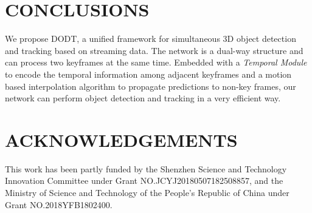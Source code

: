 \documentclass[letterpaper, 10pt, conference]{ieeeconf}  %
\begin{document}
\section{CONCLUSIONS}
\label{sec:conclusions} We propose DODT, a unified framework for simultaneous 3D object detection and tracking based on streaming data. The network is a dual-way structure and can  process two keyframes at the same time. Embedded with a \textit{Temporal Module} to encode the temporal information among adjacent keyframes and a motion based interpolation algorithm to propagate predictions to non-key frames, our network can perform object detection and tracking in a very efficient way. 
\section{ACKNOWLEDGEMENTS}
This work has been partly funded by the Shenzhen Science and Technology Innovation Committee under Grant NO.JCYJ20180507182508857, and the Ministry of Science and Technology of the People's Republic of China under Grant NO.2018YFB1802400.


\end{document}
